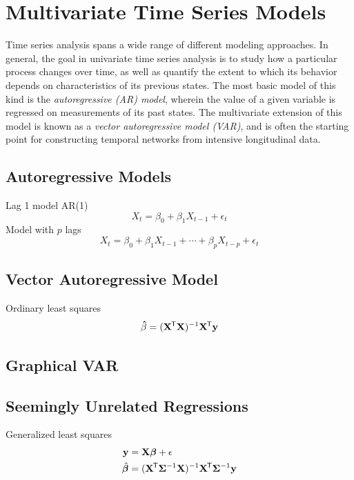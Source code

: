 \section{Multivariate Time Series Models}
Time series analysis spans a wide range of different modeling approaches. In general, the goal in univariate time series analysis is to study how a particular process changes over time, as well as quantify the extent to which its behavior depends on characteristics of its previous states. The most basic model of this kind is the \textit{autoregressive (AR) model}, wherein the value of a given variable is regressed on measurements of its past states. The multivariate extension of this model is known as a \textit{vector autoregressive model (VAR)}, and is often the starting point for constructing temporal networks from intensive longitudinal data.


\subsection{Autoregressive Models}
Lag 1 model AR(1)
\begin{equation}
    X_t = \beta_0 + \beta_1 X_{t - 1} + \epsilon_t
\end{equation}
Model with $p$ lags
\begin{equation}
    X_t = \beta_0 + \beta_1 X_{t - 1} + \cdots + \beta_p X_{t - p} + \epsilon_t
\end{equation}

\subsection{Vector Autoregressive Model}
Ordinary least squares
\begin{equation}
    \mathbf{\hat{\beta}} = (\mathbf{X}^{\mkern-1.5mu\mathsf{T}} \mathbf{X})^{-1} \mathbf{X}^{\mkern-1.5mu\mathsf{T}} \mathbf{y}
\end{equation}

\subsection{Graphical VAR}

\subsection{Seemingly Unrelated Regressions}
Generalized least squares
\begin{equation}
    \begin{split}
        \mathbf{y} &= \mathbf{X}\bm{\beta} + \epsilon \\
        \hat{\bm{\beta}} &= (\mathbf{X}^{\mkern-1.5mu\mathsf{T}} \bm{\Sigma}^{-1} \mathbf{X})^{-1} \mathbf{X}^{\mkern-1.5mu\mathsf{T}} \bm{\Sigma}^{-1} \mathbf{y}
    \end{split}
\end{equation}

